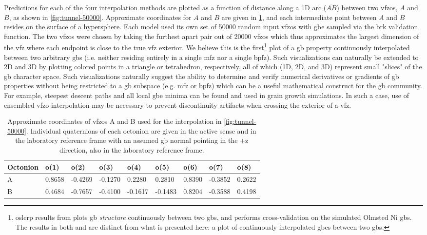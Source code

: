 \documentclass[final,twocolumn,12pt]{elsarticle}
\newcommand{\inpt}{input}
\begin{document}
{Predictions for each of the four interpolation methods are plotted as a function of distance along a 1D arc ($\overline{AB}$) between two \glspl{vfzo}, $A$ and $B$, as shown in \cref{fig:tunnel-50000}. Approximate coordinates for $A$ and $B$ are given in \cref{tab:tunnel-AB}, and each intermediate point between $A$ and $B$ resides on the surface of a hypersphere. Each model used its own set of \num{50000} random \inpt{} \glspl{vfzo} with \gls{gbe} sampled via the \gls{brk} validation function. The two \glspl{vfzo} were chosen by taking the furthest apart pair out of \num{20000} \glspl{vfzo} which thus approximates the largest dimension of the \gls{vfz} where each endpoint is close to the true \gls{vfz} exterior. We believe this is the first\footnote{\Gls{oslerp} results from \cite{francisGeodesicOctonionMetric2019} plots \gls{gb} \textit{structure} continuously between two \glspl{gb}, and \cite{chesserLearningGrainBoundary2020} performs cross-validation on the simulated Olmsted Ni \glspl{gb}. The results in both \cite{francisGeodesicOctonionMetric2019} and \cite{chesserLearningGrainBoundary2020} are distinct from what is presented here: a plot of continuously interpolated \glspl{gbe} between two \glspl{gb}.} plot of a \gls{gb} property continuously interpolated between two arbitrary \glspl{gb} (i.e. neither residing entirely in a single \gls{mfz} nor a single \gls{bpfz}). Such visualizations can naturally be extended to 2D and 3D by plotting colored points in a triangle or tetrahedron, respectively, all of which (1D, 2D, and 3D) represent small "slices" of the \gls{gb} character space. Such visualizations naturally suggest the ability to determine and verify numerical derivatives or gradients of \gls{gb} properties without being restricted to a \gls{gb} subspace (e.g. \gls{mfz} or \gls{bpfz}) which can be a useful mathematical construct for the \gls{gb} community. For example, steepest descent paths and all local \gls{gbe} minima can be found and used in grain growth simulations. In such a case, use of ensembled \gls{vfzo} interpolation may be necessary to prevent discontinuity artifacts when crossing the exterior of a \gls{vfz}.

\begin{table}[]
\centering
\caption{Approximate coordinates of \glspl{vfzo} A and B used for the interpolation in \cref{fig:tunnel-50000}. Individual quaternions of each octonion are given in the active sense and in the laboratory reference frame with an assumed \gls{gb} normal pointing in the +z direction, also in the laboratory reference frame.}
\label{tab:tunnel-AB}
\begin{tabular}{@{}lllllllll@{}}
\toprule
Octonion & o(1)   & o(2)    & o(3)    & o(4)    & o(5)    & o(6)   & o(7)    & o(8)   \\ \midrule
A        & 0.8658 & -0.4269 & -0.1270 & 0.2280  & 0.2810  & 0.8390 & -0.3852 & 0.2622 \\
B        & 0.4684 & -0.7657 & -0.4100 & -0.1617 & -0.1483 & 0.8204 & -0.3588 & 0.4198 \\ \bottomrule
\end{tabular}
\end{table}
    
}
\end{document}
